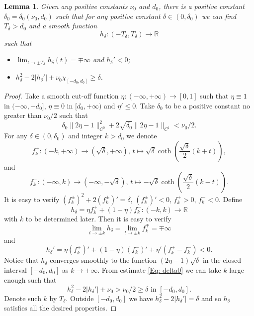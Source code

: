 \documentclass[11pt,letterpaper]{amsart}
\numberwithin{equation}{section}
\newtheorem{lemma}[theorem]{Lemma}
\theoremstyle{definition}
\begin{document}
\begin{lemma}\label{Lem: weight function 1}
Given any positive constants $\nu_0$ and $d_0$, there is a positive constant $\delta_0=\delta_0(\nu_0,d_0)$ such that for any positive constant $\delta\in (0,\delta_0)$ we can find $T_\delta>d_0$ and a smooth function
$$h_\delta:(-T_\delta,T_\delta)\to \mathbb R$$ such that
\begin{itemize}\setlength{\itemsep}{1mm}
\item $\lim_{t\to\pm T_\delta}h_\delta(t)=\mp\infty$ and $h_\delta'<0$;
\item $h_\delta^2-2|h_\delta'|+\nu_0\chi_{[-d_0,d_0]}\geq \delta$.
\end{itemize}
\end{lemma}
\begin{proof}
Take a smooth cut-off function $\eta:(-\infty,+\infty)\to [0,1]$ such that $\eta\equiv 1$ in $(-\infty,-d_0]$, $\eta\equiv 0$ in $[d_0,+\infty)$ and $\eta'\leq 0$. Take $\delta_0$ to be a positive constant no greater than $\nu_0/2$ such that
\begin{equation}\label{Eq: delta0}
\delta_0\|2\eta-1\|_{C^0}^2+2\sqrt{\delta_0}\|2\eta-1\|_{C^1}<\nu_0/2.
\end{equation}
For any $\delta\in (0,\delta_0)$ and integer $k>d_0$ we denote
$$
f_k^+:(-k,+\infty)\to (\sqrt\delta,+\infty),\,t\mapsto\sqrt \delta\coth\left(\frac{\sqrt\delta }{2}(k+t)\right),
$$
and
\begin{equation}\label{Eq: fk-}
f_k^-:(-\infty,k)\to (-\infty,-\sqrt\delta),\,t\mapsto-\sqrt \delta\coth\left(\frac{\sqrt\delta }{2}(k-t)\right).
\end{equation}
It is easy to verify $(f_k^{\pm})^2+2(f_k^\pm)'=\delta$, $(f_k^{\pm})'<0$, $f_k^+>0$, $f_k^-<0$.
Define
$$
h_\delta=\eta f_k^++(1-\eta)f_k^-:(-k,k)\to\mathbb R
$$
with $k$ to be determined later.
Then it is easy to verify
$$
\lim_{t\to\pm k} h_\delta=\lim_{t\to \pm k}f_{k}^{\mp}=\mp\infty
$$
and
$$
h_\delta'=\eta (f^+_k)'+(1-\eta)(f_k^-)'+\eta'(f^+_k-f_k^-)<0.
$$
Notice that $h_\delta$ converges smoothly to the function $(2\eta-1)\sqrt\delta$ in the closed interval $[-d_0,d_0]$ as $k\to+\infty$. From estimate \eqref{Eq: delta0} we can take $k$ large enough such that
$$h_\delta^2-2|h_\delta'|+\nu_0>\nu_0/2\geq \delta\mbox{ in }[-d_0,d_0].$$
Denote such $k$ by $T_{\delta}$. Outside $[-d_0,d_0]$ we have $h_\delta^2-2|h_\delta'|=\delta$ and so $h_\delta$ satisfies all the desired properties.
\end{proof}
\end{document}
